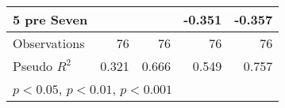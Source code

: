 \begin{table}[htbp]
\begin{tabular}{l*{4}{D{.}{.}{-1}}}
5 pre Seven         &                     &                     &      -0.351\sym{**} &      -0.357\sym{***}\\
\midrule
Observations        &          76         &          76         &          76         &          76         \\
Pseudo \(R^{2}\)    &       0.321         &       0.666         &       0.549         &       0.757         \\
\bottomrule
{}\\
\end{tabular}
\end{table}
